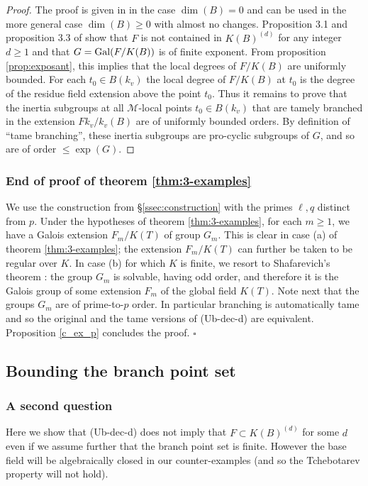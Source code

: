 \documentclass[12pt,english]{amsart}
\newtheorem{twisting lemma}[theorem]{Twisting lemma}
\begin{document}
\begin{proof} The proof is given in \cite{ChZa} in the case $\dim(B)=0$ and can be used in the more general case $\dim(B) \geq 0$ with almost no changes. Proposition 3.1 and proposition 3.3 of \cite{ChZa} show that 
$F$  is not contained in $K(B)^{(d)}$ for any integer $d\geq 1$ and that $G={\hbox{\rm Gal}}(F/K(B))$ is of finite exponent. From proposition \ref{prop:exposant}, this implies that the local degrees of $F/K(B)$ are uniformly bounded. For each $t_0\in B(k_v)$ the local degree of $F/K(B)$ at $t_0$ is the degree of the residue field extension above 
the  point $t_0$. Thus it remains to prove that the inertia subgroups at all ${\mathcal M}$-local points $t_0\in B(k_v)$ that are tamely branched in the extension $Fk_v/k_v(B)$ are of uniformly bounded orders. By definition of ``tame branching'', these inertia subgroups are pro-cyclic subgroups of $G$, and so are of order $\leq \exp(G)$.
\end{proof}

\subsubsection{End of proof of theorem \ref{thm:3-examples}}\label{ssec:finite}
We use the construction from \S \ref{ssec:construction} with the primes $\ell, q$ distinct from $p$. Under the hypotheses of  theorem \ref{thm:3-examples}, for each $m\geq 1$, we have a Galois extension $F_m/K(T)$ of group $G_m$. This is clear in case (a) of  theorem \ref{thm:3-examples}; the extension $F_m/K(T)$ can further be taken to be regular over $K$. In case (b) for which $K$ is finite, we resort to Shafarevich's theorem \cite{Neuk}: the group $G_m$ is solvable, having odd order, and therefore it is the Galois group of some extension $F_m$ of the global field $K(T)$. 
Note next that the groups $G_m$ are of prime-to-$p$ order. In particular branching is automatically tame and 
so the original and the tame versions of  {\rm (Ub-dec-d)} are equivalent. Proposition \ref{c_ex_p} concludes the proof. $\square$

\subsection{Bounding the branch point set} 
\label{ssec:alg-clos-car-positive}

\subsubsection{A second question} \label{ssec:refined-question}
Here we show that (Ub-dec-d) does not imply that $F\subset K(B)^{(d)}$ for some $d$ even if we assume further that the branch point set is finite. However the base field will
be algebraically closed in our counter-examples (and so the Tchebotarev property 
will not hold). 
\end{document}
